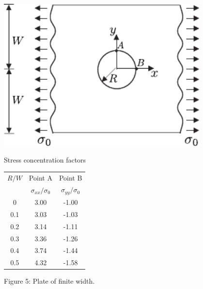 \documentclass[11pt,a4paper]{article}
\begin{document}
\hspace{1cm} \begin{minipage}[]{8cm}
	\includegraphics[width=0.8\textwidth]{figs/finite-plate.pdf} 
	\label{Figure-5}
\end{minipage} \hspace{1cm}
\begin{minipage}[]{6cm} Stress concentration factors\vspace{2mm}
	
	\begin{tabular}{c c c }
		\hline \hline
		$R/W$ & Point A & Point B \\
		& $\sigma_{xx}/\sigma_0$ & $\sigma_{yy}/\sigma_0$\\ \hline
		0 & 3.00 & -1.00 \\
		0.1 & 3.03 & -1.03 \\
		0.2 & 3.14 & -1.11 \\
		0.3 & 3.36 & -1.26 \\
		0.4 & 3.74 & -1.44 \\
		0.5 & 4.32 & -1.58 \\ \hline
	\end{tabular}
\end{minipage}

\centerline{Figure 5: Plate of finite width.}
\end{document}
